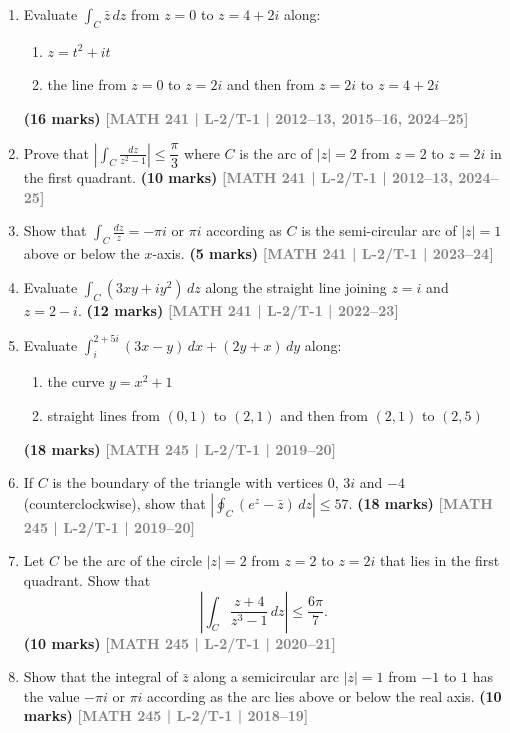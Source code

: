 \documentclass[12pt,a3paper]{article}
\newcommand{\yr}[1]{\hfill\textcolor{gray}{\small\textbf{[#1]}}}
\newcommand{\mk}[1]{\textcolor{orange!70!black}{\small\textbf{(#1 marks)}}}
\begin{document}
\begin{enumerate}

  \item Evaluate $\displaystyle\int_{C}\bar{z}\,dz$ from $z=0$ to $z=4+2i$ along: 
\begin{enumerate}
  \item $z=t^{2}+it$
  \item the line from $z=0$ to $z=2i$ and then from $z=2i$ to $z=4+2i$
\end{enumerate}
\mk{16} \yr{MATH 241 | L-2/T-1 | 2012--13, 2015--16, 2024--25}


\item Prove that $\left|\displaystyle\int_{C}\frac{dz}{z^{2}-1}\right|\le\dfrac{\pi}{3}$ where $C$ is the arc of $|z|=2$ from $z=2$ to $z=2i$ in the first quadrant.
\mk{10} \yr{MATH 241 | L-2/T-1 | 2012--13, 2024--25}


\item Show that $\displaystyle\int_{C}\frac{dz}{z}=-\pi i$ or $\pi i$ according as $C$ is the semi-circular arc of $|z|=1$ above or below the $x$-axis.
\mk{5} \yr{MATH 241 | L-2/T-1 | 2023--24}


\item Evaluate $\displaystyle\int_{C}(3xy+iy^{2})\,dz$ along the straight line joining $z=i$ and $z=2-i$.
\mk{12} \yr{MATH 241 | L-2/T-1 | 2022--23}


\item Evaluate $\displaystyle\int_{i}^{2+5i}(3x-y)\,dx+(2y+x)\,dy$ along: 
\begin{enumerate}
  \item the curve $y=x^{2}+1$
  \item straight lines from $(0,1)$ to $(2,1)$ and then from $(2,1)$ to $(2,5)$
\end{enumerate}
\mk{18} \yr{MATH 245 | L-2/T-1 | 2019--20}


\item If $C$ is the boundary of the triangle with vertices $0$, $3i$ and $-4$ (counterclockwise), show that $\left|\displaystyle\oint_{C}(e^{z}-\bar{z})\,dz\right|\le 57$.
\mk{18} \yr{MATH 245 | L-2/T-1 | 2019--20}


\item Let $C$ be the arc of the circle $|z|=2$ from $z=2$ to $z=2i$ that lies in the first quadrant. Show that
\[
\left|\int_{C} \frac{z+4}{z^{3}-1}\,dz\right| \leq \frac{6\pi}{7}.
\]
\mk{10} \yr{MATH 245 | L-2/T-1 | 2020--21}


\item Show that the integral of $\bar{z}$ along a semicircular arc $|z|=1$ from $-1$ to $1$ has the value $-\pi i$ or $\pi i$ according as the arc lies above or below the real axis.
\mk{10} \yr{MATH 245 | L-2/T-1 | 2018--19}



\end{enumerate}
\end{document}
